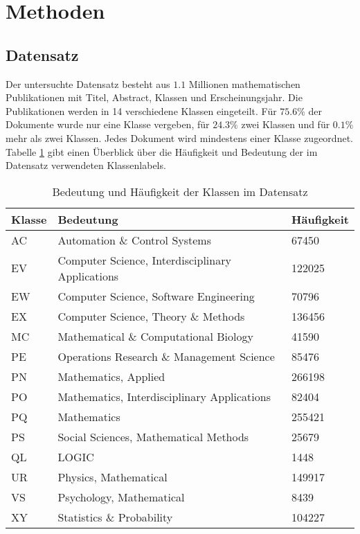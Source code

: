 \section{Methoden}


\subsection{Datensatz}
\label{sub:datensatz}
Der untersuchte Datensatz besteht aus $1.1$ Millionen mathematischen Publikationen mit Titel, Abstract, Klassen und Erscheinungsjahr.
Die Publikationen werden in 14 verschiedene Klassen eingeteilt.
Für $75.6 \%$ der Dokumente wurde nur eine Klasse vergeben, für $24.3 \%$ zwei Klassen und für $0.1 \%$ mehr als zwei Klassen.
Jedes Dokument wird mindestens einer Klasse zugeordnet.
Tabelle \ref{tab:class_meaning} gibt einen Überblick über die Häufigkeit und Bedeutung der im Datensatz verwendeten Klassenlabels.

\begin{table}[h]
    \centering
    \begin{tabular}{l|l|l}
        \textbf{Klasse} & \textbf{Bedeutung} & \textbf{Häufigkeit}\\
        \hline
        AC & Automation \& Control Systems & 67450\\
        EV & Computer Science, Interdisciplinary Applications & 122025\\
        EW & Computer Science, Software Engineering & 70796\\
        EX & Computer Science, Theory \& Methods & 136456\\
        MC & Mathematical \& Computational Biology & 41590\\
        PE & Operations Research \& Management Science & 85476\\
        PN & Mathematics, Applied & 266198\\
        PO & Mathematics, Interdisciplinary Applications & 82404\\
        PQ & Mathematics & 255421\\
        PS & Social Sciences, Mathematical Methods & 25679\\
        QL & LOGIC & 1448\\
        UR & Physics, Mathematical & 149917\\
        VS & Psychology, Mathematical & 8439\\
        XY & Statistics \& Probability & 104227\\
    \end{tabular}
    \caption{Bedeutung und Häufigkeit der Klassen im Datensatz}
    \label{tab:class_meaning}
\end{table}



